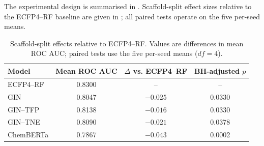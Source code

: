 \documentclass[11pt,a4paper]{article}
\begin{document}
The experimental design is summarised in . Scaffold-split effect sizes relative to the ECFP4--RF baseline are given in ; all paired tests operate on the five per-seed means.

%
\begin{table}[ht!]
	\centering
	\caption{Scaffold-split effects relative to ECFP4--RF. Values are differences in mean ROC AUC; paired tests use the five per-seed means ($df=4$).}
	\label{tab:effect_summary}
	\begin{tabular}{lccc}
		\toprule
		Model & Mean ROC AUC & $\Delta$ vs. ECFP4--RF & BH-adjusted $p$ \\
		\midrule
		ECFP4--RF & \num{0.8300} & {--} & {--} \\
		GIN & \num{0.8047} & $-\num{0.025}$ & \num{0.0330} \\
		GIN--TFP & \num{0.8138} & $-\num{0.016}$ & \num{0.0330} \\
		GIN--TNE & \num{0.8090} & $-\num{0.021}$ & \num{0.0378} \\
		ChemBERTa & \num{0.7867} & $-\num{0.043}$ & \num{0.0002} \\
		\bottomrule
	\end{tabular}
\end{table}


\begin{table}[ht!]
\centering
\caption{Mean test ROC AUC $\pm$ SD of the five per-seed means (each seed averages five fold-level test AUCs). The underlying analysis comprises \num{25} fold--seed replicates per split. Reported $p$-values are raw paired tests on the five per-seed means versus ECFP4--RF under the scaffold protocol; Benjamini--Hochberg correction across the four comparisons yields adjusted $p$-values of \num{0.0330} (GIN), \num{0.0330} (GIN--TFP), \num{0.0378} (GIN--TNE) and \num{0.0002} (ChemBERTa). The GIN--TNE contrast is the weakest of the four (adjusted $p = \num{0.0378}$) yet survives correction. Statistical procedures are detailed in the Methods.}
\label{tab:h1}
\end{table}
\end{document}
